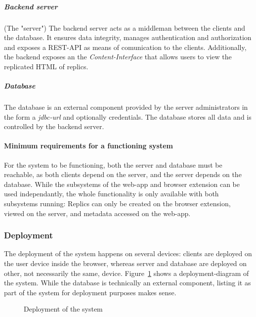 \subparagraph{Backend server} (The "server")
The backend server acts as a middleman between the clients and the database.
It ensures data integrity, manages authentication and authorization and exposes a REST-API as means of comunication to the clients.
Additionally, the backend exposes an the \textit{Content-Interface} that allows users to view the replicated HTML of replics.

\subparagraph{Database}
The database is an external component provided by the server administrators in the form a \textit{jdbc-url} and optionally credentials.
The database stores all data and is controlled by the backend server.

\paragraph{Minimum requirements for a functioning system}
For the system to be functioning, both the server and database must be reachable, as both clients depend on the server, and the server depends on the database.
While the subsystems of the web-app and browser extension can be used independantly, the whole functionality is only available with both subsystems running: Replics can only be created on the browser extension, viewed on the server, and metadata accessed on the web-app.

\subsubsection{Deployment}
The deployment of the system happens on several devices: clients are deployed on the user device inside the browser, whereas server and database are deployed on other, not necessarily the same, device.
Figure~\ref{fig:deployment} shows a deployment-diagram of the system.
While the database is technically an external component, listing it as part of the system for deployment purposes makes sense.

\begin{figure}
    \centering

    \caption{Deployment of the system}
    \label{fig:deployment}
\end{figure}


